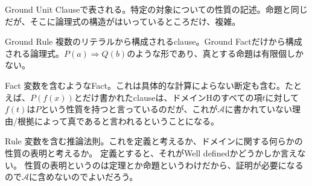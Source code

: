 \documentclass[10pt, oneside]{jarticle}   	%
\begin{document}
\begin{description}
\item[ Ground Fact] Ground Unit Clauseで表される。特定の対象についての性質の記述。命題と同じだが、そこに論理式の構造がはいっているところだけ、複雑。
\item{Ground Rule} 複数のリテラルから構成されるclause。Ground Factだけから構成される論理式。$P(a) ⇒ Q(b)$のような形であり、真とする命題は有限個しかない。
\item{Fact} 変数を含むようなFact。これは具体的な計算によらない断定も含む。たとえば、$P(f(x))$とだけ書かれたclauseは、ドメインHのすべての項$t$に対して$f(t)$は$P$という性質を持つと言っているのだが、これが$\mathcal{A}$に書かれていない理由/根拠によって真であると言われるということになる。
\item{Rule} 変数を含む推論法則。これを定義と考えるか、ドメインに関する何らかの性質の表明と考えるか。
定義とすると、それがWell definedかどうかしか言えない。
性質の表明というのは定理とか命題というわけだから、証明が必要になるので$\mathcal{A}$に含めないのでよいだろう。
\end{description}
\end{document}
